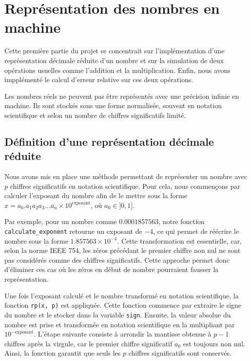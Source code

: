 \documentclass{article}
\begin{document}
\section{Représentation des nombres en machine}
\label{sec:rep_nb_machine}

Cette première partie du projet se concentrait sur l'implémentation d'une représentation décimale réduite d'un nombre et sur la simulation de deux opérations usuelles comme l'addition et la multiplication. Enfin, nous avons impplémenté le calcul d'erreur relative sur ces deux opérations.

Les nombres réels ne peuvent pas être représentés avec une précision infinie en machine. Ils sont stockés sous une forme normalisée, souvent en notation scientifique et selon un nombre de chiffres significatifs limité.

\subsection{Définition d'une représentation décimale réduite}
Nous avons mis en place une méthode permettant de représenter un nombre avec $p$ chiffres significatifs en notation scientifique. Pour cela, nous commençons par calculer l'exposant du nombre afin de le mettre sous la forme $x = a_0.a_1a_2a_3...a_n \times 10^{\text{exposant}}$, où $a_0 \in ]0,1]$. 

Par exemple, pour un nombre comme $0.0001857563$, notre fonction \texttt{calculate\_exponent} retourne un exposant de $-4$, ce qui permet de réécrire le nombre sous la forme $1.857563 \times 10^{-4}$. Cette transformation est essentielle, car, selon la norme IEEE 754, les zéros précédant le premier chiffre non nul ne sont pas considérés comme des chiffres significatifs. Cette approche permet donc d’éliminer ces cas où les zéros en début de nombre pourraient fausser la représentation. 

Une fois l'exposant calculé et le nombre transformé en notation scientifique, la fonction \texttt{rp(x, p)} est appliquée. Cette fonction commence par extraire le signe du nombre et le stocker dans la variable \texttt{sign}. Ensuite, la valeur absolue du nombre est prise et transformée en notation scientifique en la multipliant par $10^{-\text{exposant}}$. L'étape suivante consiste à arrondir la mantisse obtenue à $p-1$ chiffres après la virgule, car le premier chiffre significatif $a_0$ est toujours non nul. Ainsi, la fonction garantit que seuls les $p$ chiffres significatifs sont conservés.
\end{document}
